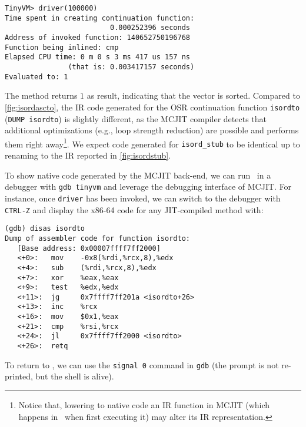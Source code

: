 \begin{small}
\begin{verbatim}
TinyVM> driver(100000)
Time spent in creating continuation function:
                         0.000252396 seconds
Address of invoked function: 140652750196768
Function being inlined: cmp
Elapsed CPU time: 0 m 0 s 3 ms 417 us 157 ns
               (that is: 0.003417157 seconds)
Evaluated to: 1
\end{verbatim}
\end{small}

\noindent The method returns $1$ as result, indicating that the vector is sorted. Compared to \myfigure\ref{fig:isordascto}, the IR code generated for the OSR continuation function {\tt isordto} ({\tt DUMP isordto}) is slightly different, as the MCJIT compiler detects that additional optimizations (e.g., loop strength reduction) are possible and performs them right away\footnote{Notice that, lowering to native code an IR function in MCJIT (which happens in \tinyvm\ when first executing it) may alter its IR representation. }. We expect code generated for {\tt isord\_stub} to be identical up to renaming to the IR reported in \myfigure\ref{fig:isordstub}.

To show native code generated by the MCJIT back-end, we can run \tinyvm\ in a debugger with {\small\tt gdb tinyvm} and leverage the debugging interface of MCJIT. For instance, once {\tt driver} has been invoked, we can switch to the debugger with {\tt CTRL-Z} and display the x86-64 code for any JIT-compiled method with:
\begin{small}
\begin{verbatim}
(gdb) disas isordto
Dump of assembler code for function isordto:
   [Base address: 0x00007ffff7ff2000]
   <+0>:   mov    -0x8(%rdi,%rcx,8),%edx
   <+4>:   sub    (%rdi,%rcx,8),%edx
   <+7>:   xor    %eax,%eax
   <+9>:   test   %edx,%edx
   <+11>:  jg     0x7ffff7ff201a <isordto+26>
   <+13>:  inc    %rcx
   <+16>:  mov    $0x1,%eax
   <+21>:  cmp    %rsi,%rcx
   <+24>:  jl     0x7ffff7ff2000 <isordto>
   <+26>:  retq
\end{verbatim}
\end{small}

\noindent To return to \tinyvm, we can use the {\tt signal 0} command in {\tt gdb} (the prompt is not re-printed, but the shell is alive).
